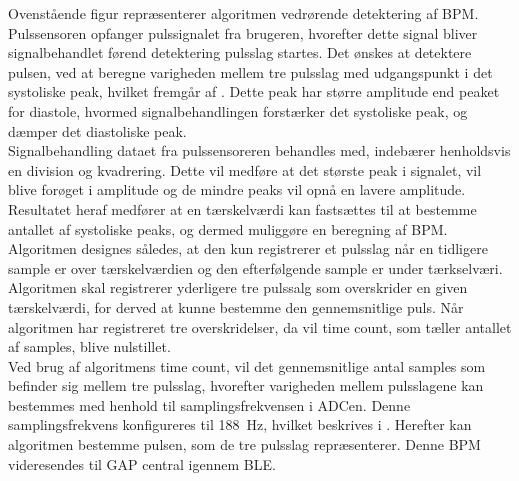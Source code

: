 {Ovenstående figur repræsenterer algoritmen vedrørende detektering af BPM. Pulssensoren opfanger pulssignalet fra brugeren, hvorefter dette signal bliver signalbehandlet førend detektering pulsslag startes. Det ønskes at detektere pulsen, ved at beregne varigheden mellem tre pulsslag med udgangspunkt i det systoliske peak, hvilket fremgår af . Dette peak har større amplitude end peaket for diastole, hvormed signalbehandlingen forstærker det systoliske peak, og dæmper det diastoliske peak.  \\
Signalbehandling dataet fra pulssensoreren behandles med, indebærer henholdsvis en division og kvadrering. Dette vil medføre at det største peak i signalet, vil blive forøget i amplitude og de mindre peaks vil opnå en lavere amplitude. Resultatet heraf medfører at en tærskelværdi kan fastsættes til at bestemme antallet af systoliske peaks, og dermed muliggøre en beregning af BPM. \\
Algoritmen designes således, at den kun registrerer et pulsslag når en tidligere sample er over tærskelværdien og den efterfølgende sample er under tærkselværi. Algoritmen skal registrerer yderligere tre pulssalg som overskrider en given tærskelværdi, for derved at kunne bestemme den gennemsnitlige puls. Når algoritmen har registreret tre overskridelser, da vil time count, som tæller antallet af samples, blive nulstillet. \\
Ved brug af algoritmens time count, vil det gennemsnitlige antal samples som befinder sig mellem tre pulsslag, hvorefter varigheden mellem pulsslagene kan bestemmes med henhold til samplingsfrekvensen i ADCen. Denne samplingsfrekvens konfigureres til 188~Hz, hvilket beskrives i . Herefter kan algoritmen bestemme pulsen, som de tre pulsslag repræsenterer. Denne BPM videresendes til GAP central igennem BLE. 


}
